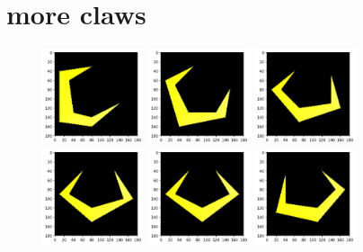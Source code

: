 \chapter{more claws}
\label{sec:more_claws}
\lstset{style=68KStyle}

\begin{figure}[H]
  \centering
    \includegraphics[width=3cm]{build_t2k_claws/final_claw_0_graph.png}
    \includegraphics[width=3cm]{build_t2k_claws/final_claw_1_graph.png}
    \includegraphics[width=3cm]{build_t2k_claws/final_claw_2_graph.png}
    \includegraphics[width=3cm]{build_t2k_claws/final_claw_3_graph.png}
    \includegraphics[width=3cm]{build_t2k_claws/final_claw_4_graph.png}
    \includegraphics[width=3cm]{build_t2k_claws/final_claw_5_graph.png}

\end{figure}
